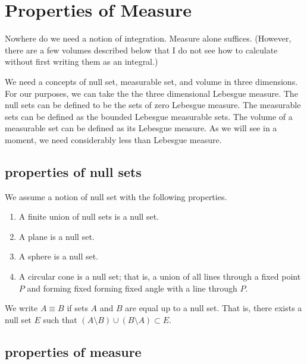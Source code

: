 
\section{Properties of Measure}

Nowhere do we need a notion
of integration.  Measure alone suffices.  (However, there are a few
volumes described below that I do not see how to calculate without
first writing them as an integral.)

We need a concepts of null set, measurable set, and volume in
three dimensions.  For our purposes, we can take the
the three dimensional Lebesgue measure.   
The null sets can be defined
to be the sets of zero Lebesgue measure. The measurable sets can
be defined as the bounded Lebesgue measurable sets.  The volume of
a measurable set can be defined as its Lebesgue measure.
As we will see in a moment, we need considerably less than Lebesgue measure.



\subsection{properties of null sets}

We assume a notion of null set with the following
properties.

\begin{enumerate}%
\item A finite union of null sets is a null set.\\
 \item A plane is a null set.\\
 \item A sphere is a null set.\\
 \item A circular cone is a null set; that is, a union of all
  lines through a fixed point $P$ and forming fixed
 forming fixed angle with a line through $P$.
\end{enumerate}

We write $A\equiv B$ if sets $A$ and $B$ are equal up to a null set.
That is, there exists a null set $E$ such that
   $(A\setminus B) \cup (B\setminus A) \subset E$.

\subsection{properties of measure}

